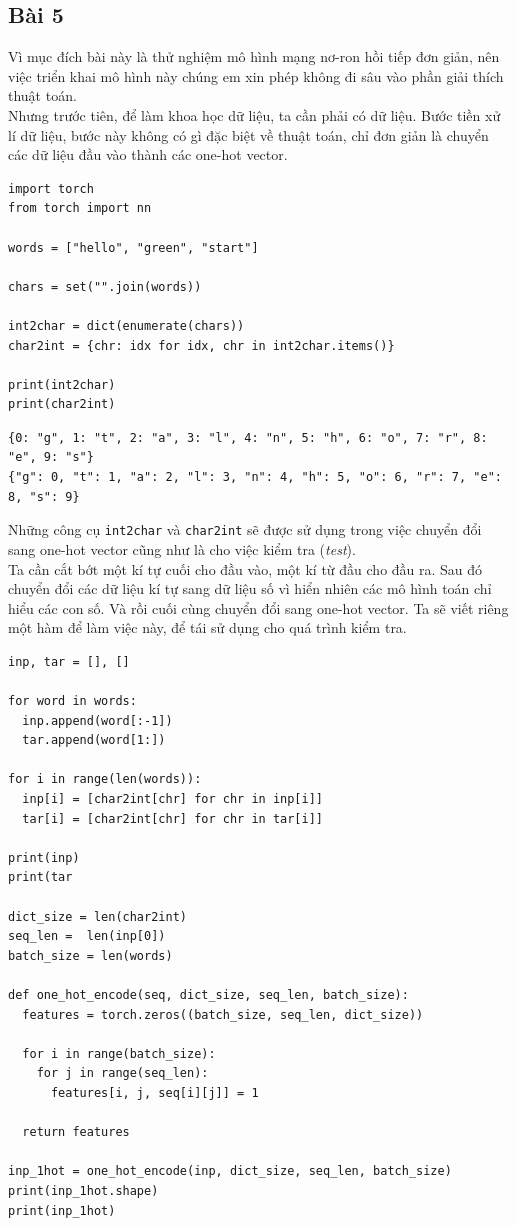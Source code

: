 \documentclass[a4paper]{article}
\begin{document}
\subsection{Bài 5}
Vì mục đích bài này là thử nghiệm mô hình mạng nơ-ron hồi tiếp đơn giản, nên việc triển khai mô hình này chúng em xin phép không đi sâu vào phần giải thích thuật toán.\\
Nhưng trước tiên, để làm khoa học dữ liệu, ta cần phải có dữ liệu. Bước tiền xử lí dữ liệu, bước này không có gì đặc biệt về thuật toán, chỉ đơn giản là chuyển các dữ liệu đầu vào thành các one-hot vector.
\begin{lstlisting}
import torch
from torch import nn

words = ["hello", "green", "start"]

chars = set("".join(words))

int2char = dict(enumerate(chars))
char2int = {chr: idx for idx, chr in int2char.items()}

print(int2char)
print(char2int)
\end{lstlisting}
\begin{verbatim}
{0: "g", 1: "t", 2: "a", 3: "l", 4: "n", 5: "h", 6: "o", 7: "r", 8: "e", 9: "s"}
{"g": 0, "t": 1, "a": 2, "l": 3, "n": 4, "h": 5, "o": 6, "r": 7, "e": 8, "s": 9}
\end{verbatim}
Những công cụ \texttt{int2char} và \texttt{char2int} sẽ được sử dụng trong việc chuyển đổi sang one-hot vector cũng như là cho việc kiểm tra (\textit{test}).\\
Ta cần cắt bớt một kí tự cuối cho đầu vào, một kí từ đầu cho đầu ra. Sau đó chuyển đổi các dữ liệu kí tự sang dữ liệu số vì hiển nhiên các mô hình toán chỉ hiểu các con số. Và rồi cuối cùng chuyển đổi sang one-hot vector. Ta sẽ viết riêng một hàm để làm việc này, để tái sử dụng cho quá trình kiểm tra.
\begin{lstlisting}
inp, tar = [], []

for word in words:
  inp.append(word[:-1])
  tar.append(word[1:])

for i in range(len(words)):
  inp[i] = [char2int[chr] for chr in inp[i]]
  tar[i] = [char2int[chr] for chr in tar[i]]

print(inp)
print(tar

dict_size = len(char2int)
seq_len =  len(inp[0])
batch_size = len(words)

def one_hot_encode(seq, dict_size, seq_len, batch_size):
  features = torch.zeros((batch_size, seq_len, dict_size))

  for i in range(batch_size):
    for j in range(seq_len):
      features[i, j, seq[i][j]] = 1

  return features
  
inp_1hot = one_hot_encode(inp, dict_size, seq_len, batch_size)
print(inp_1hot.shape)
print(inp_1hot)
\end{lstlisting}
\end{document}
